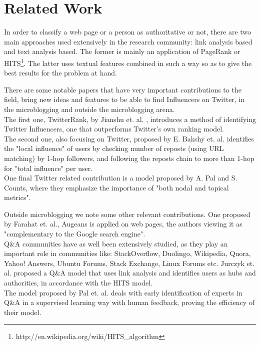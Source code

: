 \chapter{Related Work}
\label{sec:related-work}

%
%
%

In order to classify a web page or a person as authoritative or not, there are two main approaches used extensively in the research community: link analysis based and text analysis based. The former is mainly an application of PageRank\cite{pagerank} or HITS\footnote{\label{hits}http://en.wikipedia.org/wiki/HITS\_algorithm}\cite{hits}. The latter uses textual features combined in such a way so as to give the best results for the problem at hand.

There are some notable papers that have very important contributions to the field, bring new ideas and features to be able to find Influencers on Twitter, in the microblogging and outside the microblogging arena.\\
The first one, TwitterRank, by Jianshu et. al. \cite{twitterrank}, introduces a method of identifying Twitter Influencers, one that outperforms Twitter's own ranking model.\\
The second one, also focusing on Twitter, proposed by E. Bakshy et. al.\cite{bakshy} identifies the "local influence" of users by checking number of reposts (using URL matching) by 1-hop followers, and following the reposts chain to more than 1-hop for "total influence" per user.\\
One final Twitter related contribution is a model proposed by A. Pal and S. Counts\cite{microblogs}, where they emphasize the importance of "both nodal and topical metrics".

Outside microblogging we note some other relevant contributions. One proposed by Farahat et. al., Augeans\cite{augeas} is applied on web pages, the authors viewing it as "complementary to the Google search engine".\\
Q\&A communities have as well been extensively studied, as they play an important role in communities like: StackOverflow, Duolingo, Wikipedia, Quora, Yahoo! Answers, Ubuntu Forums, Stack Exchange, Linux Forums etc.
Jurczyk et. al.\cite{qalink} proposed a Q\&A model that uses link analysis and identifies users as hubs and authorities, in accordance with the HITS\cite{hits} model.\\
The model proposed by Pal et. al.\cite{qapal} deals with early identification of experts in Q\&A in a supervised learning way with human feedback, proving the efficiency of their model.

